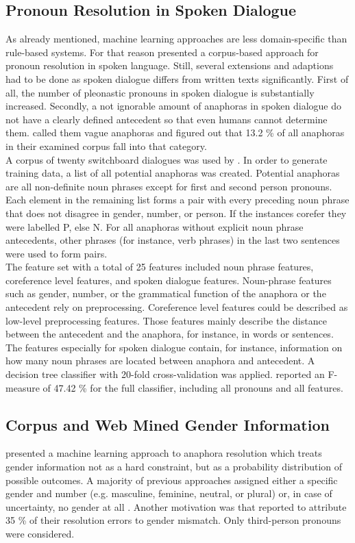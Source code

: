 \subsection{Pronoun Resolution in Spoken Dialogue}
As already mentioned, machine learning approaches are less domain-specific than rule-based systems. For that reason \cite{strube2003machine} presented a corpus-based approach for pronoun resolution in spoken language. Still, several extensions and adaptions had to be done as spoken dialogue differs from written texts significantly. First of all, the number of pleonastic pronouns in spoken dialogue is substantially increased. Secondly, a not ignorable amount of anaphoras in spoken dialogue do not have a clearly defined antecedent so that even humans cannot determine them. \cite{eckert2000dialogue} called them vague anaphoras and figured out that 13.2 \% of all anaphoras in their examined corpus fall into that category.\\
A corpus of twenty switchboard dialogues was used by \cite{strube2003machine}. In order to generate training data, a list of all potential anaphoras was created. Potential anaphoras are all non-definite noun phrases except for first and second person pronouns. Each element in the remaining list forms a pair with every preceding noun phrase that does not disagree in gender, number, or person. If the instances corefer they were labelled P, else N. For all anaphoras without explicit noun phrase antecedents, other phrases (for instance, verb phrases) in the last two sentences were used to form pairs. \\
The feature set with a total of 25 features included noun phrase features, coreference level features, and spoken dialogue features. Noun-phrase features such as gender, number, or the grammatical function of the anaphora or the antecedent rely on preprocessing. Coreference level features could be described as low-level preprocessing features. Those features mainly describe the distance between the antecedent and the anaphora, for instance, in words or sentences. The features especially for spoken dialogue contain, for instance, information on how many noun phrases are located between anaphora and antecedent.
A decision tree classifier with 20-fold cross-validation was applied. \citep{strube2003machine} reported an F-measure of 47.42 \% for the full classifier, including all pronouns and all features. 

\subsection{Corpus and Web Mined Gender Information}
\label{section:bergsma2005automatic}
\cite{bergsma2005automatic} presented a machine learning approach to anaphora resolution which treats gender information not as a hard constraint, but as a probability distribution of possible outcomes. A majority of previous approaches assigned either a specific gender and number (e.g. masculine, feminine, neutral, or plural) or, in case of uncertainty, no gender at all \citep{soon2001machine, broscheit2010bart}. Another motivation was that \cite{kennedy1996anaphora} reported to attribute 35 \% of their resolution errors to gender mismatch. Only third-person pronouns were considered.

